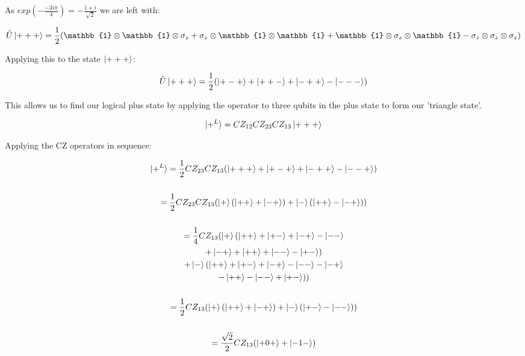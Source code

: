 As $exp(-\frac{-3 i \pi}{4}) = - \frac{1 + i}{\sqrt{2}}$ we are left with:

\begin{equation}
\label{eq:u_final3_l}
\hat{U} \ket{+ + +}= \frac{1}{2}
(\mathbb{1} \otimes \mathbb{1} \otimes \sigma_{z}
+ \sigma_{z} \otimes \mathbb{1} \otimes \mathbb{1} \\
+ \mathbb{1} \otimes \sigma_{z} \otimes \mathbb{1}
- \sigma_{z} \otimes \sigma_{z} \otimes \sigma_{z}) \\
\end{equation}

Applying this to the state $\ket{+ + +}$:

\begin{equation}
\label{eq:logical3plus_u}
\hat{U}\ket{+ + +} = \frac{1}{2}(\ket{+-+} +\ket{++-} + \ket{-++} - \ket{---})
\end{equation}

This allows us to find our logical plus state by applying the operator to three qubits in the plus state to form our 'triangle state'.

\begin{equation}
\ket{+^{L}} = CZ_{12} CZ_{23} CZ_{13} \ket{+++}
\end{equation}

Applying the CZ operators in sequence:

\begin{multline*}
\ket{+^{L}} = \frac{1}{2} CZ_{23} CZ_{13}
(\ket{+++} + \ket{+-+} + \ket{-++} - \ket{--+}) \\ \\
= \frac{1}{2} CZ_{23} CZ_{13} (\ket{+}(\ket{++} + \ket{-+}) + \ket{-}(\ket{++} - \ket{-+})) \\ \\
= \frac{1}{4} CZ_{13} (\ket{+}(\ket{++} + \ket{+-} + \ket{-+} - \ket{--} 
\\+ \ket{-+} + \ket{++} + \ket{--} -\ket{+-})\\
+ \ket{-}(\ket{++} + \ket{+-} + \ket{-+} -\ket{--} - \ket{-+} 
\\- \ket{++} - \ket{--} + \ket{+-})) \\ \\
= \frac{1}{2} CZ_{13} (\ket{+}(\ket{++} + \ket{-+}) + \ket{-}(\ket{+-} - \ket{--})) \\ \\
= \frac{\sqrt{2}}{2} CZ_{13} (\ket{+0+} + \ket{-1-}) \\
\end{multline*}

